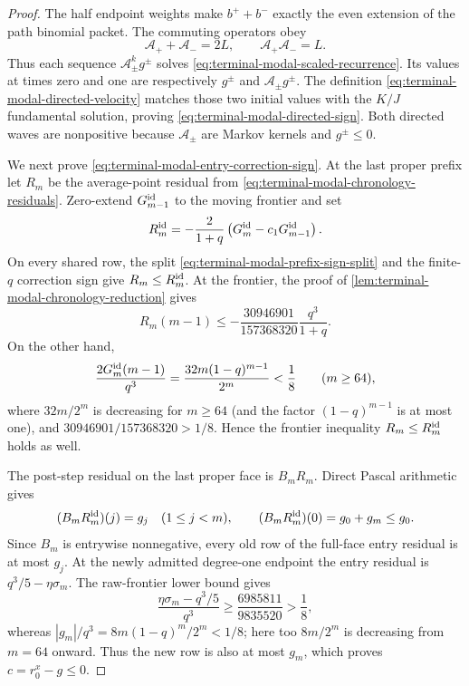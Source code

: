\begin{proof}
The half endpoint weights make $b^++b^-$ exactly the even extension of the
path binomial packet.  The commuting operators obey
\[
 \mathcal A_++\mathcal A_-=2L,\qquad
 \mathcal A_+\mathcal A_-=L.
\]
Thus each sequence $\mathcal A_\pm^kg^\pm$ solves
\eqref{eq:terminal-modal-scaled-recurrence}.  Its values at times zero and
one are respectively $g^\pm$ and $\mathcal A_\pm g^\pm$.  The definition
\eqref{eq:terminal-modal-directed-velocity} matches those two initial values
with the $K/J$ fundamental solution, proving
\eqref{eq:terminal-modal-directed-sign}.  Both directed waves are
nonpositive because $\mathcal A_\pm$ are Markov kernels and $g^\pm\le0$.

We next prove \eqref{eq:terminal-modal-entry-correction-sign}.  At the last
proper prefix let $R_m$ be the average-point residual from
\eqref{eq:terminal-modal-chronology-residuals}.  Zero-extend
$G_{m-1}^{\rm id}$ to the moving frontier and set
\[
 R_m^{\rm id}
 =-\frac{2}{1+q}\left(G_m^{\rm id}-c_1G_{m-1}^{\rm id}\right).
\]
On every shared row, the split
\eqref{eq:terminal-modal-prefix-sign-split} and the finite-$q$ correction
sign give $R_m\le R_m^{\rm id}$.  At the frontier, the proof of
\cref{lem:terminal-modal-chronology-reduction} gives
\[
 R_m(m-1)\le
 -\frac{30946901}{157368320}\frac{q^3}{1+q}.
\]
On the other hand,
\[
 \frac{2G_m^{\rm id}(m-1)}{q^3}
 =\frac{32m(1-q)^{m-1}}{2^m}<\frac18
 \qquad(m\ge64),
\]
where $32m/2^m$ is decreasing for $m\ge64$ (and the factor
$(1-q)^{m-1}$ is at most one),
and $30946901/157368320>1/8$.  Hence the frontier inequality
$R_m\le R_m^{\rm id}$ holds as well.

The post-step residual on the last proper face is $B_mR_m$.  Direct Pascal
arithmetic gives
\[
 (B_mR_m^{\rm id})(j)=g_j\quad(1\le j<m),\qquad
 (B_mR_m^{\rm id})(0)=g_0+g_m\le g_0.
\]
Since $B_m$ is entrywise nonnegative, every old row of the full-face entry
residual is at most $g_j$.  At the newly admitted degree-one endpoint the
entry residual is $q^3/5-\eta\sigma_m$.  The raw-frontier lower bound gives
\[
 \frac{\eta\sigma_m-q^3/5}{q^3}
 \ge \frac{6985811}{9835520}>\frac18,
\]
whereas
$|g_m|/q^3=8m(1-q)^m/2^m<1/8$; here too $8m/2^m$ is decreasing from
$m=64$ onward.  Thus the new row is also at most $g_m$,
which proves $c=r_0^x-g\le0$.


\end{proof}
